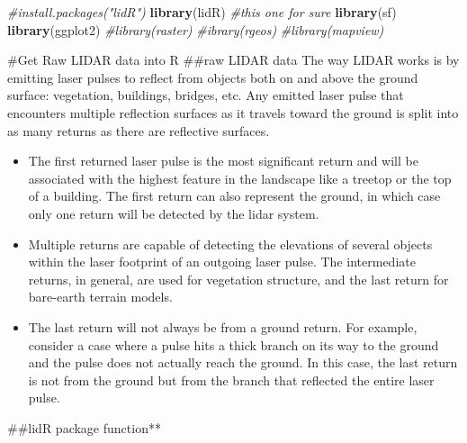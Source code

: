 \documentclass[]{article}
\newenvironment{Shaded}{\begin{snugshade}}{\end{snugshade}}
\newcommand{\CommentTok}[1]{\textcolor[rgb]{0.56,0.35,0.01}{\textit{#1}}}
\newcommand{\KeywordTok}[1]{\textcolor[rgb]{0.13,0.29,0.53}{\textbf{#1}}}
\newcommand{\NormalTok}[1]{#1}
\newcommand{\StringTok}[1]{\textcolor[rgb]{0.31,0.60,0.02}{#1}}
\begin{document}
\begin{Shaded}
\begin{Highlighting}[]
\CommentTok{#install.packages("lidR")}
\KeywordTok{library}\NormalTok{(lidR) }\CommentTok{#this one for sure}
\KeywordTok{library}\NormalTok{(sf)}
\KeywordTok{library}\NormalTok{(ggplot2)}
\CommentTok{#library(raster)}
\CommentTok{#ibrary(rgeos)}
\CommentTok{#library(mapview)}
\end{Highlighting}
\end{Shaded}

\#Get Raw LIDAR data into R \#\#raw LIDAR data The way LIDAR works is by
emitting laser pulses to reflect from objects both on and above the
ground surface: vegetation, buildings, bridges, etc. Any emitted laser
pulse that encounters multiple reflection surfaces as it travels toward
the ground is split into as many returns as there are reflective
surfaces.

\begin{itemize}
\item
  The first returned laser pulse is the most significant return and will
  be associated with the highest feature in the landscape like a treetop
  or the top of a building. The first return can also represent the
  ground, in which case only one return will be detected by the lidar
  system.
\item
  Multiple returns are capable of detecting the elevations of several
  objects within the laser footprint of an outgoing laser pulse. The
  intermediate returns, in general, are used for vegetation structure,
  and the last return for bare-earth terrain models.
\item
  The last return will not always be from a ground return. For example,
  consider a case where a pulse hits a thick branch on its way to the
  ground and the pulse does not actually reach the ground. In this case,
  the last return is not from the ground but from the branch that
  reflected the entire laser pulse.
\end{itemize}

\#\#lidR package function**

\begin{Shaded}
\end{Shaded}
\end{document}

